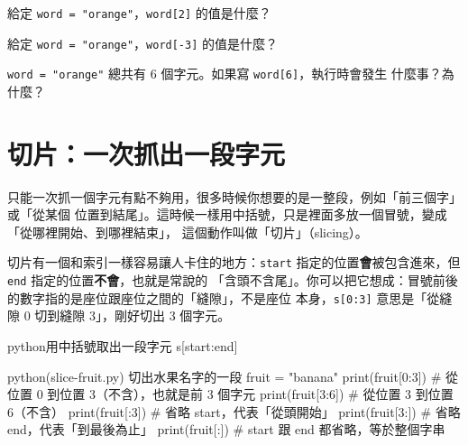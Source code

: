 \begin{drills}[label=drills:string-indexing]
\item 給定 \texttt{word = "orange"}，\texttt{word[2]} 的值是什麼？
\item 給定 \texttt{word = "orange"}，\texttt{word[-3]} 的值是什麼？
\item \texttt{word = "orange"} 總共有 6 個字元。如果寫 \texttt{word[6]}，執行時會發生
什麼事？為什麼？
\end{drills}

\section{切片：一次抓出一段字元}
\label{sec:string-slicing}

只能一次抓一個字元有點不夠用，很多時候你想要的是一整段，例如「前三個字」或「從某個
位置到結尾」。這時候一樣用中括號，只是裡面多放一個冒號，變成「從哪裡開始、到哪裡結束」，
這個動作叫做「切片」（slicing）。

切片有一個和索引一樣容易讓人卡住的地方：\texttt{start}
指定的位置\textbf{會}被包含進來，但 \texttt{end} 指定的位置\textbf{不會}，也就是常說的
「含頭不含尾」。你可以把它想成：冒號前後的數字指的是座位跟座位之間的「縫隙」，不是座位
本身，\texttt{s[0:3]} 意思是「從縫隙 0 切到縫隙 3」，剛好切出 3 個字元。

\begin{code}{python}{用中括號取出一段字元}
s[start:end]
\end{code}

\begin{example}{python}{(slice-fruit.py) 切出水果名字的一段}
fruit = "banana"
print(fruit[0:3])   # 從位置 0 到位置 3（不含），也就是前 3 個字元
print(fruit[3:6])   # 從位置 3 到位置 6（不含）
print(fruit[:3])     # 省略 start，代表「從頭開始」
print(fruit[3:])     # 省略 end，代表「到最後為止」
print(fruit[:])       # start 跟 end 都省略，等於整個字串
\end{example}



